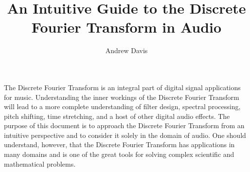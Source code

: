 \documentclass{article}
\title{An Intuitive Guide to the Discrete Fourier Transform in Audio}
\author{Andrew Davis}
\begin{document}
	\maketitle
	
	The Discrete Fourier Transform is an integral part of digital signal applications for music.  Understanding the
	inner workings of the Discrete Fourier Transform  will lead to a more complete understanding of filter
	design, spectral processing, pitch shifting, time stretching, and a host of other digital audio effects.  The 
	purpose of this document is to approach the Discrete Fourier Transform from an intuitive perspective and to
	consider it solely in the domain of audio.  One should understand, however, that the Discrete 
	Fourier Transform 
	has applications in many domains and is one of the great tools for solving complex scientific and 
	mathematical problems.  
	
	
	
	
	
	
	
	
	\newpage
\end{document}
